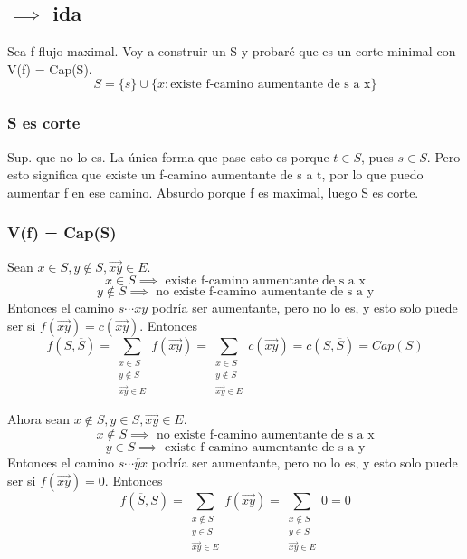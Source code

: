 \documentclass[11pt]{article}
\begin{document}
\subsection*{\(\implies\) ida}
\label{sec:org14c455c}
Sea f flujo maximal. Voy a construir un S y probaré que es un corte minimal con V(f) = Cap(S).
\[ S = \{s\} \cup \{x \colon \text{existe f-camino aumentante de s a x}\} \]
\subsubsection*{S es corte}
\label{sec:orgbbdd50b}
Sup. que no lo es. La única forma que pase esto es porque \(t \in S\), pues \(s \in S\). Pero esto significa que existe un f-camino aumentante de s a t, por lo que puedo aumentar f en ese camino. Absurdo porque f es maximal, luego S es corte.

\subsubsection*{V(f) = Cap(S)}
\label{sec:org7024579}
Sean \(x \in S, y \not\in S, \overrightarrow{xy} \in E\).
\[ x \in S \implies \text{ existe f-camino aumentante de s a x} \]
\[ y \not\in S \implies \text{ no existe f-camino aumentante de s a y} \]
Entonces el camino \(s \cdots x y\) podría ser aumentante, pero no lo es, y esto solo puede ser si \(f(\overrightarrow{xy})=c(\overrightarrow{xy})\). Entonces
\[f(S, \overline{S}) = \sum_{\substack{x \in S \\ y \not\in S \\ \overrightarrow{xy} \in E}} f(\overrightarrow{xy}) = \sum_{\substack{x \in S \\ y \not\in S \\ \overrightarrow{xy} \in E}} c(\overrightarrow{xy}) = c(S, \overline{S}) = Cap(S) \]


Ahora sean \(x \not\in S, y \in S, \overrightarrow{xy} \in E\).
\[ x \not\in S \implies \text{ no existe f-camino aumentante de s a x} \]
\[ y \in S \implies \text{ existe f-camino aumentante de s a y} \]
Entonces el camino \(s \cdots \overleftarrow{yx}\) podría ser aumentante, pero no lo es, y esto solo puede ser si \(f(\overrightarrow{xy})=0\). Entonces
\[f(\overline{S}, S) = \sum_{\substack{x \not\in S \\ y \in S \\ \overrightarrow{xy} \in E}} f(\overrightarrow{xy}) = \sum_{\substack{x \not\in S \\ y \in S \\ \overrightarrow{xy} \in E}} 0 = 0\]
\end{document}
